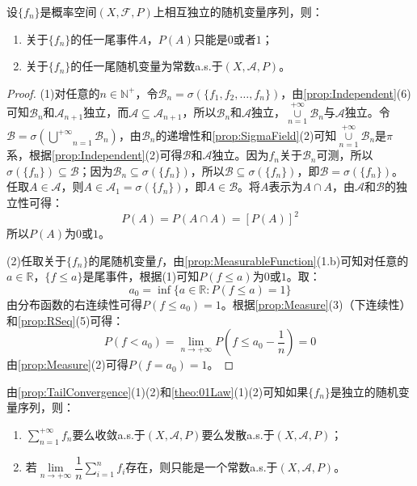 \begin{theorem}\label{theo:01Law}
	设$\{f_n\}$是概率空间$(X,\mathscr{F},P)$上相互独立的随机变量序列，则：
	\begin{enumerate}
		\item 关于$\{f_n\}$的任一尾事件$A$，$P(A)$只能是$0$或者$1$；
		\item 关于$\{f_n\}$的任一尾随机变量为常数a.s.于$(X,\mathscr{A},P)$。
	\end{enumerate}
\end{theorem}
\begin{proof}
	(1)对任意的$n\in\mathbb{N}^+$，令$\mathscr{B}_n=\sigma(\{f_1,f_2,\dots,f_n\})$，由\cref{prop:Independent}(6)可知$\mathscr{B}_n$和$\mathscr{A}_{n+1}$独立，而$\mathscr{A}\subseteq\mathscr{A}_{n+1}$，所以$\mathscr{B}_n$和$\mathscr{A}$独立，$\underset{n=1}{\overset{+\infty}{\cup}}\mathscr{B}_n$与$\mathscr{A}$独立。令$\mathscr{B}=\sigma\left(\underset{n=1}{\overset{+\infty}{\bigcup}}\mathscr{B}_n\right)$，由$\mathscr{B}_n$的递增性和\cref{prop:SigmaField}(2)可知$\underset{n=1}{\overset{+\infty}{\cup}}\mathscr{B}_n$是$\pi$系，根据\cref{prop:Independent}(2)可得$\mathscr{B}$和$\mathscr{A}$独立。因为$f_n$关于$\mathscr{B}_n$可测，所以$\sigma(\{f_n\})\subseteq\mathscr{B}$；因为$\mathscr{B}_n\subseteq\sigma(\{f_n\})$，所以$\mathscr{B}\subseteq\sigma(\{f_n\})$，即$\mathscr{B}=\sigma(\{f_n\})$。任取$A\in\mathscr{A}$，则$A\in\mathscr{A}_1=\sigma(\{f_n\})$，即$A\in\mathscr{B}$。将$A$表示为$A\cap A$，由$\mathscr{A}$和$\mathscr{B}$的独立性可得：
	\begin{equation*}
		P(A)=P(A\cap A)=[P(A)]^2
	\end{equation*}
	所以$P(A)$为$0$或$1$。\par
	(2)任取关于$\{f_n\}$的尾随机变量$f$，由\cref{prop:MeasurableFunction}(1.b)可知对任意的$a\in\mathbb{R}$，$\{f\leqslant a\}$是尾事件，根据(1)可知$P(f\leqslant a)$为$0$或$1$。取：
	\begin{equation*}
		a_0=\inf\{a\in\mathbb{R}:P(f\leqslant a)=1\}
	\end{equation*}
	由分布函数的右连续性可得$P(f\leqslant a_0)=1$。根据\cref{prop:Measure}(3)（下连续性）和\cref{prop:RSeq}(5)可得：
	\begin{equation*}
		P(f<a_0)=\lim_{n\to+\infty}P\left(f\leqslant a_0-\frac{1}{n}\right)=0
	\end{equation*}
	由\cref{prop:Measure}(2)可得$P(f=a_0)=1$。
\end{proof}
\begin{note}
	由\cref{prop:TailConvergence}(1)(2)和\cref{theo:01Law}(1)(2)可知如果$\{f_n\}$是独立的随机变量序列，则：
	\begin{enumerate}
		\item $\sum\limits_{n=1}^{+\infty}f_n$要么收敛a.s.于$(X,\mathscr{A},P)$要么发散a.s.于$(X,\mathscr{A},P)$；
		\item 若$\lim\limits_{n\to+\infty}\dfrac{1}{n}\sum\limits_{i=1}^{n}f_i$存在，则只能是一个常数a.s.于$(X,\mathscr{A},P)$。
	\end{enumerate}
\end{note}

